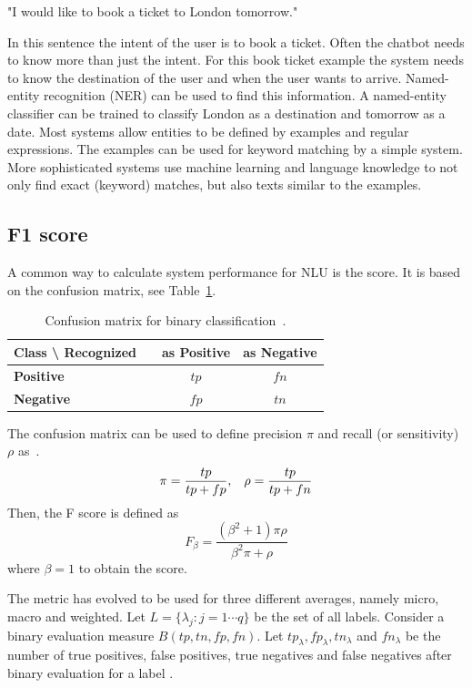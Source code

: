\begin{center}
"I would like to book a ticket to London tomorrow."
\end{center}

In this sentence the intent of the user is to book a ticket.
Often the chatbot needs to know more than just the intent.
For this book ticket example the system needs to know the destination of the user and when the user wants to arrive.
Named-entity recognition (NER) can be used to find this information.
A named-entity classifier can be trained to classify London as a destination and tomorrow as a date.
Most systems allow entities to be defined by examples and regular expressions.
The examples can be used for keyword matching by a simple system.
More sophisticated systems use machine learning and language knowledge to not only find exact (keyword) matches, but also texts similar to the examples.

\subsection{F1 score}
\label{subsec:f1_score}
A common way to calculate system performance for NLU is the \fone score.
It is based on the confusion matrix, see Table~\ref{tab:confusion}.

\begin{table}[htbp]
    \centering
    \begin{tabular}{l l c c}
        \textbf{Class \textbackslash \: Recognized} & \vline & \textbf{as Positive} & \textbf{as Negative}\\
        \hline
        \textbf{Positive} & \vline & $tp$ & $fn$\\
        \textbf{Negative} & \vline & $fp$ & $tn$\\
    \end{tabular}
    \caption{Confusion matrix for binary classification~\cite[Table 1]{sokolova2006beyond}.}
    \label{tab:confusion}
\end{table}

\noindent The confusion matrix can be used to define precision $\pi$ and recall (or sensitivity) $\rho$ as~\citep{sokolova2006beyond}.
\[
    \pi = \frac{tp}{tp + fp}, \hspace*{3mm} \rho = \frac{tp}{tp + fn}
\]
Then, the F score is defined as~\citep{debole2004supervised}
\[
    F_\beta = \frac{(\beta^2 + 1) \pi \rho}{\beta^2 \pi + \rho}
\]
where $\beta = 1$ to obtain the \fone score.

The metric has evolved to be used for three different averages, namely micro, macro and weighted.
\iffalse
Let $L = \{\lambda_j : j = 1 \cdots q\}$ be the set of all labels.
Consider a binary evaluation measure $B(tp, tn, fp, fn)$.
Let $tp_\lambda, fp_\lambda, tn_\lambda$ and $fn_\lambda$ be the number of true positives, false positives, true negatives and false negatives after binary evaluation for a label \lambda.

